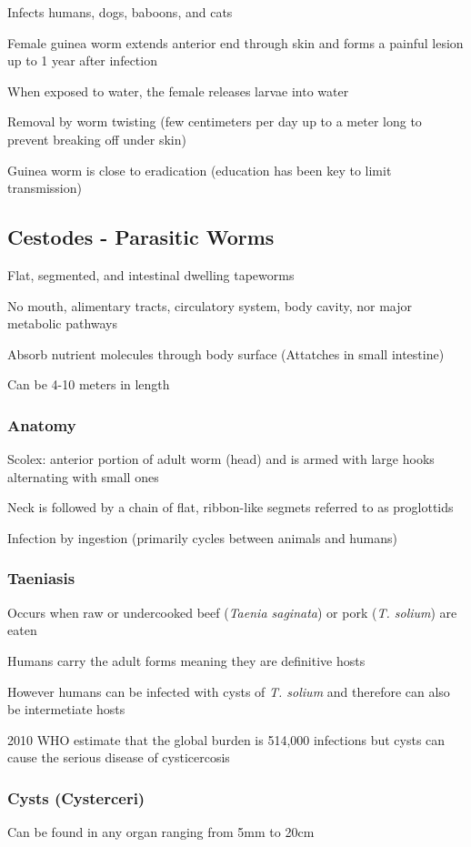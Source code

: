 \documentclass{notes}
\begin{document}
Infects humans, dogs, baboons, and cats

Female guinea worm extends anterior end through skin and forms a painful lesion up to 1 year after infection

When exposed to water, the female releases larvae into water

Removal by worm twisting (few centimeters per day up to a meter long to prevent breaking off under skin)

Guinea worm is close to eradication (education has been key to limit transmission)

\subsection*{Cestodes - Parasitic Worms}
Flat, segmented, and intestinal dwelling tapeworms

No mouth, alimentary tracts, circulatory system, body cavity, nor major metabolic pathways

\tab \indicates Absorb nutrient molecules through body surface (Attatches in small intestine)

Can be 4-10 meters in length

\subsubsection*{Anatomy}
Scolex: anterior portion of adult worm (head) and is armed with large hooks alternating with small ones

Neck is followed by a chain of flat, ribbon-like segmets referred to as proglottids

Infection by ingestion (primarily cycles between animals and humans)

\subsubsection*{Taeniasis}
Occurs when raw or undercooked beef (\textit{Taenia saginata}) or pork (\textit{T. solium}) are eaten

Humans carry the adult forms meaning they are definitive hosts

\tab \indicates However humans can be infected with cysts of \textit{T. solium} and therefore can also be intermetiate hosts

2010 WHO estimate that the global burden is 514,000 infections but cysts can cause the serious disease of cysticercosis

\subsubsection*{Cysts (Cysterceri)}
Can be found in any organ ranging from 5mm to 20cm
\end{document}
